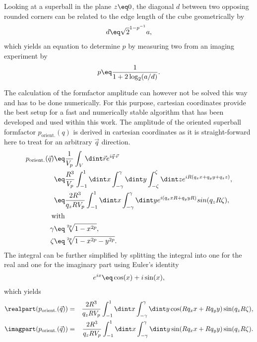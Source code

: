 \documentclass[\main/dresen_thesis.tex]{subfiles}
\begin{document}
    Looking at a superball in the plane $z \eq 0$, the diagonal $d$ between two opposing rounded corners can be related to the edge length of the cube geometrically by
    \begin{align}
      d \eq \sqrt{2}^{1-p^{-1}}a,
    \end{align}
    which yields an equation to determine $p$ by measuring two from an imaging experiment by
    \begin{align}
      p \eq \frac{1}{1 + 2\log_2(a/d)}.
    \end{align}

    The calculation of the formfactor amplitude can however not be solved this way and has to be done numerically.
    For this purpose, cartesian coordinates provide the best setup for a fast and numerically stable algorithm that has been developed and used within this work.
    The amplitude of the oriented superball formfactor $p_\mathrm{orient.}(q)$ is derived in cartesian coordinates as it is straight-forward here to treat for an arbitrary $\vec{q}$ direction.
    \begin{align}
      p_\mathrm{orient.}(\vec{q}) \eq& \frac{1}{V_p} \int_{V} \dint \vec{r} e^{i \vec{q} \cdot \vec{r}}\\
      \eq& \frac{R^3}{V_p} \int_{-1}^{1} \dint x \int_{-\gamma}^{\gamma} \dint y \int_{-\zeta}^{\zeta} \dint z  e^{iR(q_x x + q_y y + q_z z)},\\
      \eq& \frac{2R^3}{q_z R V_p} \int_{-1}^{1} \dint x \int_{-\gamma}^{\gamma} \dint y  e^{i (q_x x R + q_y y R)} sin(q_z R \zeta),\\
      \mathrm{with}\nonumber\\
      \gamma \eq& \sqrt[2p]{1-x^{2p}}, \\
      \zeta \eq& \sqrt[2p]{1-x^{2p} -y^{2p}}.
    \end{align}
    The integral can be further simplified by splitting the integral into one for the real and one for the imaginary part using Euler's identity
    \begin{align}
      e^{ix} \eq \cos(x) + i \sin(x),
    \end{align}
    which yields
    \begin{align}
      \realpart (p_\mathrm{orient.}(\vec{q})) &=& \frac{2R^3}{q_z R V_p} \int_{-1}^{1} \dint x \int_{-\gamma}^{\gamma} \dint y \cos(R q_x x + R q_y y)  \sin (q_z R \zeta),\\
      \imagpart (p_\mathrm{orient.}(\vec{q})) &=& \frac{2R^3}{q_z R V_p} \int_{-1}^{1} \dint x \int_{-\gamma}^{\gamma} \dint y \sin(R q_x x + R q_y y) \sin (q_z R \zeta).
    \end{align}
\end{document}
